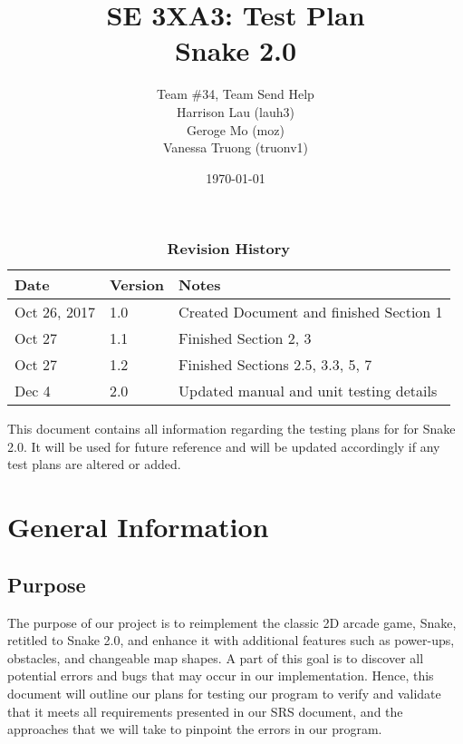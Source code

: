\documentclass[12pt, titlepage]{article}
\title{SE 3XA3: Test Plan\\Snake 2.0}
\author{Team \#34, Team Send Help
		\\ Harrison Lau	(lauh3)
		\\ Geroge Mo	(moz)
		\\ Vanessa Truong	(truonv1)
}
\date{\today}
\begin{document}
\maketitle

\tableofcontents
\listoftables
\listoffigures

\begin{table}[bp]
\caption{\bf Revision History}
\begin{tabularx}{\textwidth}{p{3cm}p{2cm}X}
\toprule {\bf Date} & {\bf Version} & {\bf Notes}\\
\midrule
Oct 26, 2017 & 1.0 & Created Document and finished Section 1\\
Oct 27 & 1.1 & Finished Section 2, 3\\
Oct 27 & 1.2 & Finished Sections 2.5, 3.3, 5, 7\\
Dec 4 & 2.0 & Updated manual and unit testing details\\
\bottomrule
\end{tabularx}
\end{table}

\newpage


This document contains all information regarding the testing plans for for Snake 2.0. It will be used for future reference and will be updated accordingly if any test plans are altered or added.

\section{General Information}

\subsection{Purpose}
The purpose of our project is to reimplement the classic 2D arcade game, Snake, retitled to Snake 2.0, and enhance it with additional features such as power-ups, obstacles, and changeable map shapes. A part of this goal is to discover all potential errors and bugs that may occur in our implementation. Hence, this document will outline our plans for testing our program to verify and validate that it meets all requirements presented in our SRS document, and the approaches that we will take to pinpoint the errors in our program.
\end{document}
